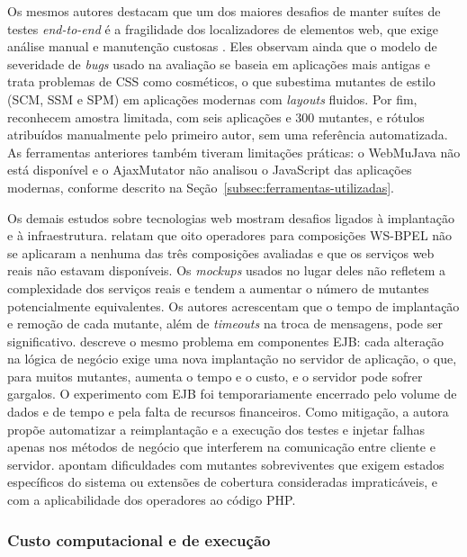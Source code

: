 Os mesmos autores destacam que um dos maiores desafios de manter suítes de testes \textit{end-to-end} é a fragilidade dos localizadores de elementos web, que exige análise manual e manutenção custosas \cite{yandrapally2021}. Eles observam ainda que o modelo de severidade de \textit{bugs} usado na avaliação se baseia em aplicações mais antigas e trata problemas de CSS como cosméticos, o que subestima mutantes de estilo (SCM, SSM e SPM) em aplicações modernas com \textit{layouts} fluidos. Por fim, reconhecem amostra limitada, com seis aplicações e 300 mutantes, e rótulos atribuídos manualmente pelo primeiro autor, sem uma referência automatizada. As ferramentas anteriores também tiveram limitações práticas: o WebMuJava não está disponível e o AjaxMutator não analisou o JavaScript das aplicações modernas, conforme descrito na Seção~\ref{subsec:ferramentas-utilizadas}.

Os demais estudos sobre tecnologias web mostram desafios ligados à implantação e à infraestrutura.  relatam que oito operadores para composições WS-BPEL não se aplicaram a nenhuma das três composições avaliadas e que os serviços web reais não estavam disponíveis. Os \textit{mockups} usados no lugar deles não refletem a complexidade dos serviços reais e tendem a aumentar o número de mutantes potencialmente equivalentes. Os autores acrescentam que o tempo de implantação e remoção de cada mutante, além de \textit{timeouts} na troca de mensagens, pode ser significativo.  descreve o mesmo problema em componentes EJB: cada alteração na lógica de negócio exige uma nova implantação no servidor de aplicação, o que, para muitos mutantes, aumenta o tempo e o custo, e o servidor pode sofrer gargalos. O experimento com EJB foi temporariamente encerrado pelo volume de dados e de tempo e pela falta de recursos financeiros. Como mitigação, a autora propõe automatizar a reimplantação e a execução dos testes e injetar falhas apenas nos métodos de negócio que interferem na comunicação entre cliente e servidor.  apontam dificuldades com mutantes sobreviventes que exigem estados específicos do sistema ou extensões de cobertura consideradas impraticáveis, e com a aplicabilidade dos operadores ao código PHP.

\subsubsection{Custo computacional e de execução}
\label{subsubsec:custo-computacional}

